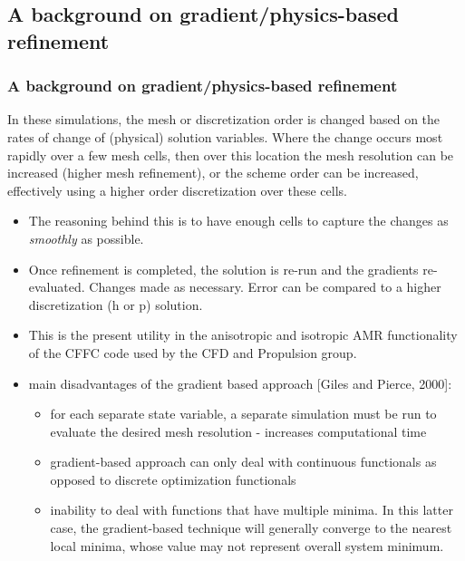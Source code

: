\documentclass{beamer}
\begin{document}
\subsection[Gradient]{A background on gradient/physics-based refinement}
\begin{frame}%
\scriptsize
\frametitle{A background on gradient/physics-based refinement}
In these simulations, the mesh or discretization order is changed based on the rates of change of (physical) solution variables.\newline
Where the change occurs most rapidly over a few mesh cells, then over this location the mesh resolution can be increased (higher mesh refinement), or the scheme order can be increased, effectively using a higher order discretization over these cells.

\begin{itemize}
\item The reasoning behind this is to have enough cells to capture the changes as \textit{smoothly} as possible.
\item Once refinement is completed, the solution is re-run and the gradients re-evaluated. Changes made as necessary. Error can be compared to a higher discretization (h or p) solution.
\item This is the present utility in the anisotropic and isotropic AMR functionality of the CFFC code used by the CFD and Propulsion group.
\item main disadvantages of the gradient based approach [Giles and Pierce, 2000]:
\begin{itemize}
\tiny
\item for each separate state variable, a separate simulation must be run to evaluate the desired mesh resolution - increases computational time
\item gradient-based approach can only deal with continuous functionals as opposed to discrete optimization functionals
\item inability to deal with functions that have multiple minima. In this latter case, the gradient-based technique will generally converge to the nearest local minima, whose value may not represent overall system minimum.
\end{itemize}
\end{itemize}
\end{frame}

\end{document}
